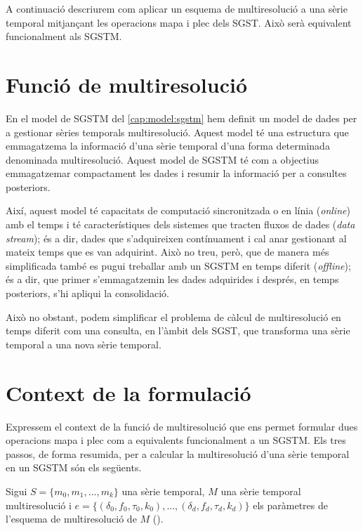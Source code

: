 A continuació descriurem com aplicar un esquema de
multiresolució a una sèrie temporal mitjançant les operacions mapa i
plec dels \gls{SGST}. Això serà equivalent funcionalment als
\gls{SGSTM}.



\section{Funció de multiresolució}
\label{sec:multiresolucio:funcio}



En el model de \gls{SGSTM} del \autoref{cap:model:sgstm} hem definit
un model de dades per a gestionar sèries temporals
multiresolució. Aquest model té una estructura que emmagatzema la
informació d'una sèrie temporal d'una forma determinada denominada
multiresolució.  Aquest model de \gls{SGSTM} té com a objectius
emmagatzemar compactament les dades i resumir la informació per a
consultes posteriors.

Així, aquest model té capacitats de computació sincronitzada o en
línia (\emph{online}) amb el temps i té característiques dels sistemes
que tracten fluxos de dades (\emph{data stream}); és a dir, dades que
s'adquireixen contínuament i cal anar gestionant al mateix temps que
es van adquirint. Això no treu, però, que de manera més simplificada
també es pugui treballar amb un \gls{SGSTM} en temps diferit
(\emph{offline}); és a dir, que primer s'emmagatzemin les dades
adquirides i després, en temps posteriors, s'hi apliqui la consolidació.



Això no obstant, podem simplificar el problema de càlcul de
multiresolució en temps diferit com una consulta, en l'àmbit dels
\gls{SGST}, que transforma una sèrie temporal a una nova sèrie
temporal.




\section{Context de la formulació}

Expressem el context de la funció de multiresolució que ens permet
formular dues operacions mapa i plec com a equivalents funcionalment a
un \gls{SGSTM}.
%
Els tres passos, de forma resumida, per a calcular la multiresolució
d'una sèrie temporal en un \gls{SGSTM} són els següents.


Sigui $S=\{m_0,m_1,\dotsc,m_k\}$ una sèrie temporal, $M$ una sèrie
temporal multiresolució i $e = \{ (\delta_0,f_0,\tau_0,k_0), \ldots,
(\delta_d,f_d,\tau_d,k_d)\}$ els paràmetres de l'esquema de
multiresolució de $M$ (). 

